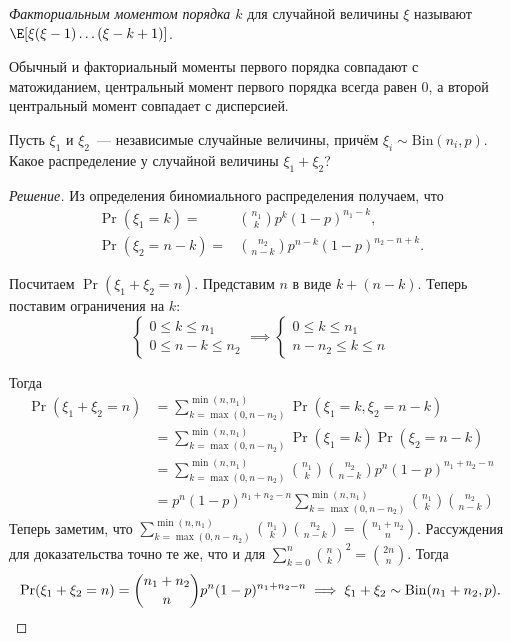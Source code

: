 \begin{definition}
    \emph{Факториальным моментом порядка \(k\)} для случайной величины \(\xi\) называют \(\E[\xi(\xi - 1)\ldots(\xi - k + 1)]\).
\end{definition}

\begin{remark}
    Обычный и факториальный моменты первого порядка совпадают с матожиданием, центральный момент первого порядка всегда равен 0, а второй центральный момент совпадает с дисперсией.
\end{remark}

\begin{problem}
    Пусть \(\xi_1\) и \(\xi_2\)~--- независимые случайные величины, причём \(\xi_i \sim \mathrm{Bin}(n_i, p)\). Какое распределение у случайной величины \(\xi_1 + \xi_2\)?
\end{problem}
\begin{proof}[Решение]
    Из определения биномиального распределения получаем, что
    \[\begin{aligned}
    \Pr(\xi_1 = k) =& \binom{n_1}{k}p^{k}(1 - p)^{n_1 - k}, \\
    \Pr(\xi_2 = n - k) =& \binom{n_2}{n - k}p^{n - k}(1 - p)^{n_2 - n + k}.
    \end{aligned}\]
    
    Посчитаем \(\Pr(\xi_1 + \xi_2 = n)\). Представим \(n\) в виде \(k + (n - k)\). Теперь поставим ограничения на \(k\):
    \[
    \begin{cases}
    0 \leq k \leq n_1 \\
    0 \leq n - k \leq n_2
    \end{cases}
    \implies
    \begin{cases}
    0 \leq k \leq n_1 \\
    n - n_2 \leq k \leq n
    \end{cases}
    \]
    
    Тогда
    \[\begin{aligned}
        \Pr(\xi_1 + \xi_2 = n) &= \sum_{k = \max(0, n - n_2)}^{\min(n, n_1)} \Pr(\xi_1 = k, \xi_2 = n - k) \\
        &= \sum_{k = \max(0, n - n_2)}^{\min(n, n_1)} \Pr(\xi_1 = k)\Pr(\xi_2 = n - k) \\
        &= \sum_{k = \max(0, n - n_2)}^{\min(n, n_1)} \binom{n_1}{k}\binom{n_2}{n - k}p^{n}(1 - p)^{n_1 + n_2 - n} \\
        &= p^{n}(1 - p)^{n_1 + n_2 - n}\sum_{k = \max(0, n - n_2)}^{\min(n, n_1)} \binom{n_1}{k}\binom{n_2}{n - k}
    \end{aligned}\]
    Теперь заметим, что \(\sum\limits_{k = \max(0, n - n_2)}^{\min(n, n_1)} \binom{n_1}{k}\binom{n_2}{n - k} = \binom{n_1 + n_2}{n}\). Рассуждения для доказательства точно те же, что и для \(\sum\limits_{k = 0}^{n} \binom{n}{k}^2 = \binom{2n}{n}\). Тогда
    \[\Pr(\xi_1 + \xi_2 = n) = \binom{n_1 + n_2}{n}p^{n}(1 - p)^{n_1 + n_2 - n} \implies \xi_1 + \xi_2 \sim \mathrm{Bin}(n_1 + n_2, p).\qedhere\]
\end{proof}

